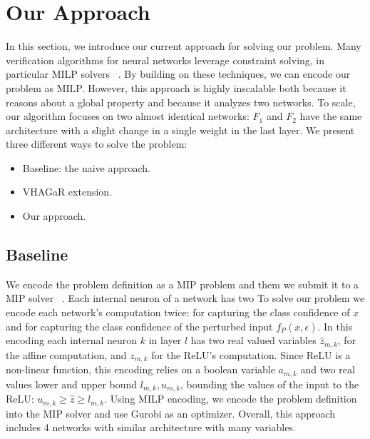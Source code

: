
\section{Our Approach}
In this section, we introduce our current approach for solving our problem.
Many verification algorithms for neural networks leverage constraint solving, in particular MILP solvers ~\cite{VHAGAR,CFXROBUSTNESS,QEBVERIF,MIPVERIFY}.
By building on these techniques, we can encode our problem as MILP. 
However, this approach is highly inscalable both because it reasons about a global property and because it analyzes two networks.
To scale, our algorithm focuses on two almost identical networks: $F_1$ and $F_2$ have the same architecture with a slight change in a single weight in the last layer. We present three different ways to solve the problem:
\begin{itemize}
    \item Baseline: the naive approach.
    \item VHAGaR extension.
    \item Our approach.
\end{itemize}
 


\subsection{Baseline}
We encode the problem definition as a MIP problem and them we submit it to a MIP solver ~\cite{MIPVERIFY}.
Each internal neuron of a network has two 
To solve our problem we encode each network's computation twice: for capturing the class confidence of $x$ and for capturing the class confidence of the perturbed input $f_P(x,\epsilon)$. In this encoding each internal neuron $k$ in layer $l$ has two real valued variables $\hat{z}_{m,k}$, for the affine computation, and ${z}_{m,k}$ for the ReLU's computation. Since ReLU is a non-linear function, this encoding relies on a boolean variable $a_{m,k}$ and two real values lower and upper bound $l_{m,k},u_{m,k}$, bounding the values of the input to the ReLU: $u_{m,k}\geq{\hat{z}}\geq{l_{m,k}}$. Using MILP encoding, we encode the problem definition into the MIP solver and use Gurobi as an optimizer.
Overall, this approach includes 4 networks with similar architecture with many variables.

